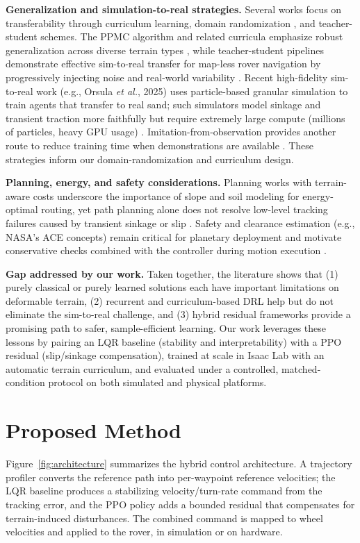 \documentclass[conference]{IEEEtran}
\begin{document}
\vspace{2mm}
\noindent\textbf{Generalization and simulation-to-real strategies.} Several works focus on transferability through curriculum learning, domain randomization \cite{tobin2017domain}, and teacher-student schemes. The PPMC algorithm and related curricula emphasize robust generalization across diverse terrain types \cite{blum2020ppmc}, while teacher-student pipelines demonstrate effective sim-to-real transfer for map-less rover navigation by progressively injecting noise and real-world variability \cite{mortensen2023teacher}. Recent high-fidelity sim-to-real work (e.g., Orsula \textit{et al.}, 2025) uses particle-based granular simulation to train agents that transfer to real sand; such simulators model sinkage and transient traction more faithfully but require extremely large compute (millions of particles, heavy GPU usage) \cite{orsula2025sim2dust}. Imitation-from-observation provides another route to reduce training time when demonstrations are available \cite{wang2025rov}. These strategies inform our domain-randomization and curriculum design.

\vspace{2mm}
\noindent\textbf{Planning, energy, and safety considerations.} Planning works with terrain-aware costs underscore the importance of slope and soil modeling for energy-optimal routing, yet path planning alone does not resolve low-level tracking failures caused by transient sinkage or slip \cite{yang2025dqnt, zhang2023energy}. Safety and clearance estimation (e.g., NASA's ACE concepts) remain critical for planetary deployment and motivate conservative checks combined with the controller during motion execution \cite{nasaACE}.

\vspace{2mm}
\noindent\textbf{Gap addressed by our work.} Taken together, the literature shows that (1) purely classical or purely learned solutions each have important limitations on deformable terrain, (2) recurrent and curriculum-based DRL help but do not eliminate the sim-to-real challenge, and (3) hybrid residual frameworks provide a promising path to safer, sample-efficient learning. Our work leverages these lessons by pairing an LQR baseline (stability and interpretability) with a PPO residual (slip/sinkage compensation), trained at scale in Isaac Lab with an automatic terrain curriculum, and evaluated under a controlled, matched-condition protocol on both simulated and physical platforms.

\section{Proposed Method}
Figure~\ref{fig:architecture} summarizes the hybrid control architecture. A trajectory profiler converts the reference path into per-waypoint reference velocities; the LQR baseline produces a stabilizing velocity/turn-rate command from the tracking error, and the PPO policy adds a bounded residual that compensates for terrain-induced disturbances. The combined command is mapped to wheel velocities and applied to the rover, in simulation or on hardware.
\end{document}
